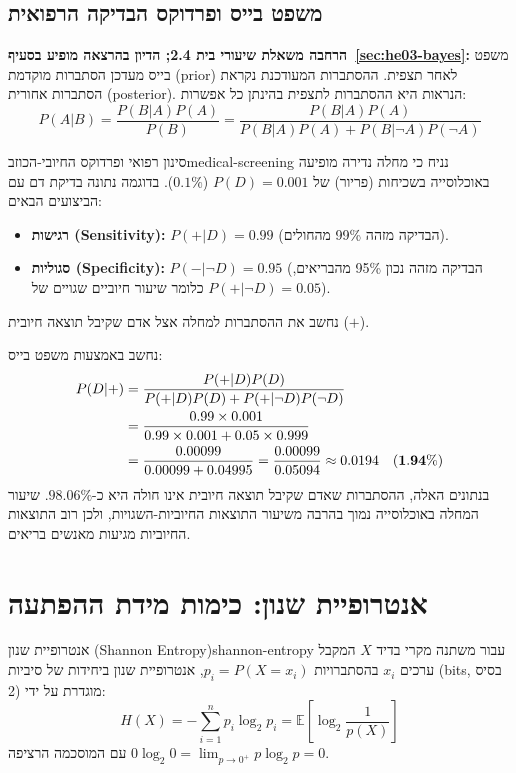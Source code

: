 \subsection{משפט בייס ופרדוקס הבדיקה הרפואית}\label{sec:bayes-screening}
\textbf{הרחבה משאלת שיעורי בית 2.4; הדיון בהרצאה מופיע בסעיף~\ref{sec:he03-bayes}:}
משפט בייס מעדכן הסתברות מוקדמת (prior) לאחר תצפית. ההסתברות המעודכנת נקראת הסתברות אחורית (posterior). הנראות היא ההסתברות לתצפית בהינתן כל אפשרות:
\begin{equation}\label{eq:bayes-rule}
P(A|B) = \frac{P(B|A)P(A)}{P(B)} = \frac{P(B|A)P(A)}{P(B|A)P(A) + P(B|\neg A)P(\neg A)}
\end{equation}

\begin{example}{סינון רפואי ופרדוקס החיובי-הכוזב}{medical-screening}
נניח כי מחלה נדירה מופיעה באוכלוסייה בשכיחות (פריור) של $P(D) = 0.001$ ($0.1\%$).
בדוגמה נתונה בדיקת דם עם הביצועים הבאים:
\begin{itemize}
\item \textbf{רגישות (\textenglish{Sensitivity}):} $P(+|D) = 0.99$ (הבדיקה מזהה 99\% מהחולים).
\item \textbf{סגוליות (\textenglish{Specificity}):} $P(-|\neg D) = 0.95$ (הבדיקה מזהה נכון 95\% מהבריאים, כלומר שיעור חיוביים שגויים של $P(+|\neg D) = 0.05$).
\end{itemize}
נחשב את ההסתברות למחלה אצל אדם שקיבל תוצאה חיובית ($+$).

נחשב באמצעות משפט בייס:
\begin{align}
P(D|+) &= \frac{P(+|D)P(D)}{P(+|D)P(D) + P(+|\neg D)P(\neg D)} \notag\\
&= \frac{0.99 \times 0.001}{0.99 \times 0.001 + 0.05 \times 0.999} \notag\\
 &= \frac{0.00099}{0.00099 + 0.04995} = \frac{0.00099}{0.05094} \approx 0.0194 \quad (\mathbf{1.94\%})
\end{align}
בנתונים האלה, ההסתברות שאדם שקיבל תוצאה חיובית אינו חולה היא כ-$98.06\%$. שיעור המחלה באוכלוסייה נמוך בהרבה משיעור התוצאות החיוביות-השגויות, ולכן רוב התוצאות החיוביות מגיעות מאנשים בריאים.
\end{example}

\section{אנטרופיית שנון: כימות מידת ההפתעה}\label{sec:shannon-entropy}

\begin{definition}{אנטרופיית שנון (\textenglish{Shannon Entropy})}{shannon-entropy}
עבור משתנה מקרי בדיד $X$ המקבל ערכים $x_i$ בהסתברויות $p_i = P(X=x_i)$, אנטרופיית שנון ביחידות של סיביות (\textenglish{bits}, בסיס 2) מוגדרת על ידי:
\begin{equation}\label{eq:shannon-def}
\boxed{H(X) = -\sum_{i=1}^n p_i \log_2 p_i = \mathbb{E}\left[\log_2 \frac{1}{p(X)}\right]}
\end{equation}
עם המוסכמה הרציפה $0 \log_2 0 = \lim_{p \to 0^+} p \log_2 p = 0$.
\end{definition}

